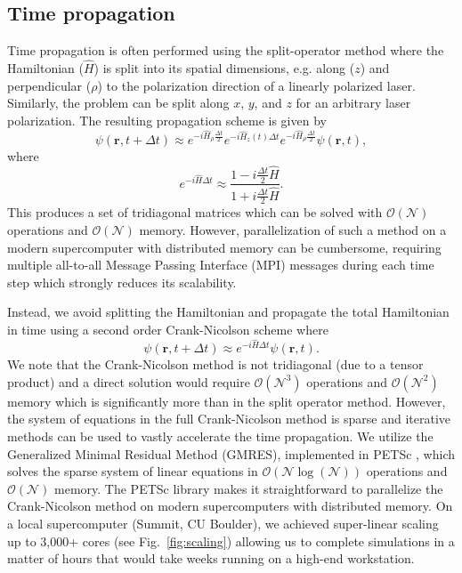 \subsection{Time propagation} %
\label{sub:time_propagation}
Time propagation is often performed using the split-operator method where the Hamiltonian ($\hat{H}$) is split into its spatial dimensions, e.g. along ($z$) and perpendicular ($\rho$) to the polarization direction of a linearly polarized laser. Similarly, the problem can be split along $x$, $y$, and $z$ for an arbitrary laser polarization. The resulting propagation scheme is given by
%
\begin{equation}
    \psi(\mathbf{r},t+\Delta t) \approx e^{-i\hat{H}_{\rho}\frac{\Delta t}{2}} e^{-i\hat{H}_z(t)\Delta t} e^{-i\hat{H}_{\rho}\frac{\Delta t}{2}}\psi(\mathbf{r},t),
     \label{eq:Split-operator}
\end{equation}
%
where
\begin{equation}
    e^{-i\hat{H}\Delta t} \approx \frac{1-i\frac{\Delta t}{2} \hat{H}}{1+i\frac{\Delta t}{2} \hat{H}}.
\end{equation}
This produces a set of tridiagonal matrices which can be solved with $\mathcal{O}(\mathcal{N})$ operations and $\mathcal{O}(\mathcal{N})$ memory. However, parallelization of such a method on a modern supercomputer with distributed memory can be cumbersome, requiring multiple all-to-all Message Passing Interface (MPI) messages during each time step which strongly reduces its scalability.

Instead, we avoid splitting the Hamiltonian and propagate the total Hamiltonian in time using a second order Crank-Nicolson scheme where
%
\begin{equation}
    \psi(\mathbf{r},t+\Delta t) \approx e^{-i\hat{H}\Delta t}\psi(\mathbf{r},t).
    \label{eq:Crank_Nicolson}
\end{equation}
%
We note that the Crank-Nicolson method is not tridiagonal (due to a tensor product) and a direct solution would require $\mathcal{O}(\mathcal{N}^3)$ operations and $\mathcal{O}(\mathcal{N}^2)$ memory which is significantly more than in the split operator method. However, the system of equations in the full Crank-Nicolson method is sparse and iterative methods can be used to vastly accelerate the time propagation. We utilize the Generalized Minimal Residual Method (GMRES), implemented in PETSc \cite{petsc-user-ref,petsc-efficient}, which solves the sparse system of linear equations in $\mathcal{O}(\mathcal{N}\log(\mathcal{N}))$ operations and $\mathcal{O}(\mathcal{N})$ memory. The PETSc library makes it straightforward to parallelize the Crank-Nicolson method on modern supercomputers with distributed memory. On a local supercomputer (Summit, CU Boulder), we achieved super-linear scaling up to 3,000+ cores (see Fig.~\ref{fig:scaling}) allowing us to complete simulations in a matter of hours that would take weeks running on a high-end workstation. 



